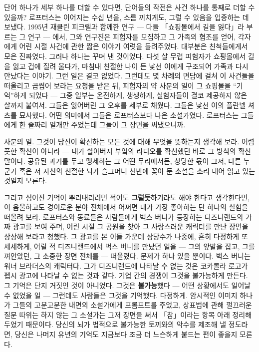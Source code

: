 단어 하나가 세부 하나를 더할 수 있다면, 단어들의 작전은 사건 하나를 통째로 더할 수 있을까? 로프터스는 이어지는 수십 년을, 소름 끼치게도, 그럴 수 있음을 입증하는 데 보냈다. 1995년 재클린 피크렐과 함께한 연구 — 다들 「쇼핑몰에서 길을 잃다」라 부르는 그 연구 — 에서, 그와 연구진은 피험자를 모집하고 그 가족의 협조를 얻어, 각자에게 어린 시절 사건에 관한 짧은 이야기 여럿을 들려주었다. 대부분은 친척들에게서 모은 진짜였다. 그러나 하나는 꾸며 낸 것이었다. 다섯 살 무렵 피험자가 쇼핑몰에서 길을 잃고 겁에 질려 울다가, 마침내 친절한 나이 든 낯선 이에게 구조되어 가족과 다시 만났다는 이야기. 그런 일은 결코 없었다. 그런데도 몇 차례의 면담에 걸쳐 이 사건들을 떠올리고 곱씹어 보라는 요청을 받은 뒤, 피험자의 약 사분의 일이 그 쇼핑몰을 ``기억''하게 되었다 — 그중 일부는 온전하게, 생생하게, 실험자들이 결코 제공하지 않은 살까지 붙여서. 그들은 잃어버린 그 오후를 세부로 채웠다. 그들은 낯선 이의 플란넬 셔츠를 묘사했다. 어떤 의미에서 그들은 로프터스보다 나은 소설가였다. 로프터스는 그들에게 한 줄짜리 얼개만 주었는데 그들이 그 장면을 써냈으니까.

사분의 일. 그것이 당신이 확신하는 모든 것에 대해 무엇을 뜻하는지 생각해 보라. 어렴풋한 확신이 아니라 — 내가 할아버지 부엌의 라디오를 확신했던 바로 그 방식의 확신 말이다. 공유된 과거를 두고 맹세하는 그 어떤 무리에서든, 상당한 몫이 그저, 다른 누군가 혹은 저 자신의 친절한 뇌가 슬그머니 선반에 꽂아 둔 소설을 소리 내어 읽고 있는 것일지 모른다.

그리고 심어진 기억이 뿌리내리려면 적어도 \textbf{그럴듯}하기라도 해야 한다고 생각한다면, 이 음울하고도 경이로운 분야 전체에서 어쩌면 내가 가장 좋아하는 단 하나의 실험을 떠올려 보라. 로프터스와 동료들은 사람들에게 벅스 버니가 등장하는 디즈니랜드의 가짜 광고를 보여 주며, 어린 시절 그 공원을 찾아 그 사랑스러운 캐릭터를 만난 장면을 상상해 보라고 청했다. 그 광고를 본 이들 가운데 상당수가 나중에, 흔히 다정하게 또 세세하게, 어릴 적 디즈니랜드에서 벅스 버니를 만났던 일을 — 그의 앞발을 잡고, 그를 껴안았던, 그 소중한 장면 전체를 — 떠올렸다. 문제가 하나 있을 뿐이다. 벅스 버니는 워너 브라더스의 캐릭터다. 그가 디즈니랜드에 나타날 수 없는 것은 코카콜라 로고가 펩시 광고에 나타날 수 없는 것과 같다. 기업 간의 경쟁이 그것을 불가능하게 만든다. 그 기억은 단지 거짓인 것이 아니었다. 그것은 \textbf{불가능}했다 — 어떤 상황에서도 일어날 수 없었을 일 — 그런데도 사람들은 그것을 기억했다. 다정하게. 암시적인 이미지 하나가 그들의 고분고분한 내면의 소설가에게 프롬프트를 주었고, 상표법에 관해 껄끄러운 질문 따위는 하지 않는 그 소설가는 그저 장면을 써서 「참」이라는 항목 아래 정리해 두었기 때문이다. 당신의 뇌가 법적으로 불가능한 토끼와의 악수를 제조해 낼 정도라면, 당신은 나머지 유년의 기억도 지금보다 조금 더 느슨하게 붙드는 편이 좋을지 모른다.

